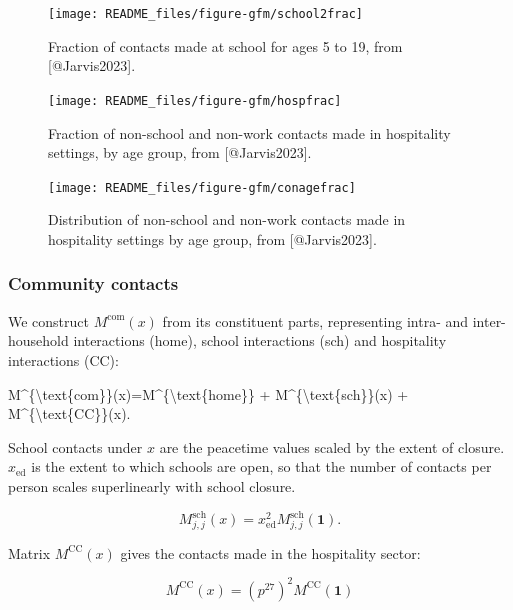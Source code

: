 \documentclass[
]{article}
\newenvironment{Shaded}{\begin{snugshade}}{\end{snugshade}}
\newcommand{\NormalTok}[1]{#1}
\begin{document}
\begin{figure}
\texttt{[image: README\_files/figure-gfm/school2frac]} \caption{Fraction of contacts made at school for ages 5 to 19, from [@Jarvis2023].}\label{fig:school2frac}
\end{figure}

\begin{figure}
\texttt{[image: README\_files/figure-gfm/hospfrac]} \caption{Fraction of non-school and non-work contacts made in hospitality settings, by age group, from [@Jarvis2023].}\label{fig:hospfrac}
\end{figure}

\begin{figure}
\texttt{[image: README\_files/figure-gfm/conagefrac]} \caption{Distribution of non-school and non-work contacts made in hospitality settings by age group, from [@Jarvis2023].}\label{fig:conagefrac}
\end{figure}

\subsubsection{Community contacts}\label{community-contacts}

We construct \(M^{\text{com}}(x)\) from its constituent parts, representing intra- and inter-household interactions (home), school interactions (sch) and hospitality interactions (CC):

\begin{Shaded}
\begin{Highlighting}[]
\NormalTok{M\^{}\{\textbackslash{}text\{com\}\}(x)=M\^{}\{\textbackslash{}text\{home\}\} + M\^{}\{\textbackslash{}text\{sch\}\}(x) + M\^{}\{\textbackslash{}text\{CC\}\}(x).}
\end{Highlighting}
\end{Shaded}

School contacts under \(x\) are the peacetime values scaled by the extent of closure. \(x_{\text{ed}}\) is the extent to which schools are open, so that the number of contacts per person scales superlinearly with school closure.

\begin{equation}
M_{j,j}^{\text{sch}}(x)=x_{\text{ed}}^2M_{j,j}^{\text{sch}}(\textbf{1}).
\label{eq:school}
\end{equation}

Matrix \(M^{\text{CC}}(x)\) gives the contacts made in the hospitality sector:

\begin{equation}
M^{\text{CC}}(x) = (p^{27})^2M^{\text{CC}}(\textbf{1})
\label{eq:hosp}
\end{equation}
\end{document}
